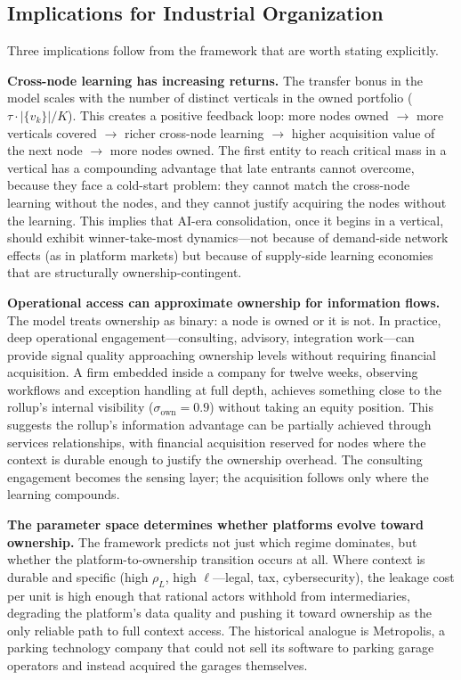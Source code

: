 \documentclass[12pt]{article}
\theoremstyle{definition}
\begin{document}
\subsection{Implications for Industrial Organization}

Three implications follow from the framework that are worth stating explicitly.

\textbf{Cross-node learning has increasing returns.} The transfer bonus in the model scales with the number of distinct verticals in the owned portfolio ($\tau \cdot |\{v_k\}| / K$). This creates a positive feedback loop: more nodes owned $\to$ more verticals covered $\to$ richer cross-node learning $\to$ higher acquisition value of the next node $\to$ more nodes owned. The first entity to reach critical mass in a vertical has a compounding advantage that late entrants cannot overcome, because they face a cold-start problem: they cannot match the cross-node learning without the nodes, and they cannot justify acquiring the nodes without the learning. This implies that AI-era consolidation, once it begins in a vertical, should exhibit winner-take-most dynamics---not because of demand-side network effects (as in platform markets) but because of supply-side learning economies that are structurally ownership-contingent.

\textbf{Operational access can approximate ownership for information flows.} The model treats ownership as binary: a node is owned or it is not. In practice, deep operational engagement---consulting, advisory, integration work---can provide signal quality approaching ownership levels without requiring financial acquisition. A firm embedded inside a company for twelve weeks, observing workflows and exception handling at full depth, achieves something close to the rollup's internal visibility ($\sigma_{\text{own}} = 0.9$) without taking an equity position. This suggests the rollup's information advantage can be partially achieved through services relationships, with financial acquisition reserved for nodes where the context is durable enough to justify the ownership overhead. The consulting engagement becomes the sensing layer; the acquisition follows only where the learning compounds.

\textbf{The parameter space determines whether platforms evolve toward ownership.} The framework predicts not just which regime dominates, but whether the platform-to-ownership transition occurs at all. Where context is durable and specific (high $\rho_L$, high $\ell$---legal, tax, cybersecurity), the leakage cost per unit is high enough that rational actors withhold from intermediaries, degrading the platform's data quality and pushing it toward ownership as the only reliable path to full context access. The historical analogue is Metropolis, a parking technology company that could not sell its software to parking garage operators and instead acquired the garages themselves.
\end{document}
